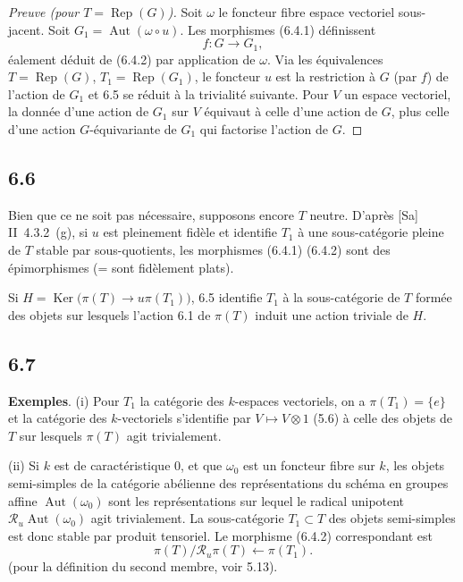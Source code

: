\documentclass[12pt,a4paper]{article}
\theoremstyle{plain}
\theoremstyle{definition}
\theoremstyle{remark}
\DeclareMathOperator{\Aut}{Aut}
\DeclareMathOperator{\Ker}{Ker}
\DeclareMathOperator{\Rep}{Rep}
\begin{document}
\begin{proof}[Preuve (pour $T = 
\Rep(G)$)]
Soit $\omega$ le foncteur fibre espace vectoriel sous-jacent. Soit $G_1 = 
\Aut(\omega 
\circ u)$. Les morphismes (6.4.1) définissent
\begin{equation*}\tag{6.5.1}
f: G 
\longrightarrow G_1,
\end{equation*}
éalement déduit de (6.4.2) par application de $\omega$. Via les équivalences $T = 
\Rep(G)$, $T_1 = 
\Rep(G_1)$, le foncteur $u$ est la restriction à $G$ (par $f$) de l'action de $G_1$ et 6.5 se réduit à la trivialité suivante. Pour $V$ un espace vectoriel, la donnée d'une action de $G_1$ sur $V$ équivaut à celle d'une action de $G$, plus celle d'une action $G$-équivariante de $G_1$ qui factorise l'action de $G$.
\end{proof}

\subsection*{6.6}
Bien que ce ne soit pas nécessaire, supposons encore $T$ neutre. D'après [Sa] II~4.3.2~(g), si $u$ est pleinement fidèle et identifie $T_1$ à une sous-catégorie pleine de $T$ stable par sous-quotients, les morphismes (6.4.1) (6.4.2) sont des épimorphismes (= sont fidèlement plats).

Si $H = 
\Ker\bigl(\pi(T) 
\to u\pi(T_1)\bigr)$, 6.5 identifie $T_1$ à la sous-catégorie de $T$ formée des objets sur lesquels l'action 6.1 de $\pi(T)$ induit une action triviale de $H$.

\subsection*{6.7}
\textbf{Exemples}. (i) Pour $T_1$ la catégorie des $k$-espaces vectoriels, on a $\pi(T_1) = 
\{e\}$ et la catégorie des $k$-vectoriels s'identifie par $V 
\mapsto V 
\otimes 1$ (5.6) à celle des objets de $T$ sur lesquels $\pi(T)$ agit trivialement.

(ii) Si $k$ est de caractéristique 0, et que $\omega_0$ est un foncteur fibre sur $k$, les objets semi-simples de la catégorie abélienne des représentations du schéma en groupes affine $\Aut(\omega_0)$ sont les représentations sur lequel le radical unipotent $\mathcal{R}_u\Aut(\omega_0)$ agit trivialement. La sous-catégorie $T_1 
\subset T$ des objets semi-simples est donc stable par produit tensoriel. Le morphisme (6.4.2) correspondant est
\[
\pi(T)/\mathcal{R}_u\pi(T) 
\longleftarrow 
\pi(T_1).
\]
(pour la définition du second membre, voir 5.13).
\end{document}

